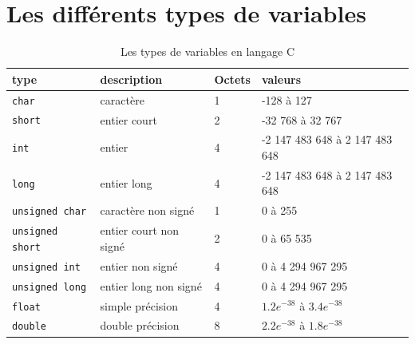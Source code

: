 \documentclass[a4paper,11pt]{book}
\theoremstyle{definition}
\begin{document}
\chapter{Les différents types de variables}
\begin{table}[!h]
\centering
\begin{tabular}{p{2.5cm}p{4cm}p{3cm}p{3cm}}
  \hline
  \textbf{type} & description & Octets & valeurs\\
  \hline
  \texttt{char} & caractère& 1&-128 à 127\\
  \texttt{short}& entier court& 2&-32 768 à 32 767\\
  \texttt{int}& entier& 4&-2 147 483 648 à 2 147 483 648\\
  \texttt{long}& entier long& 4&-2 147 483 648 à 2 147 483 648\\
  \texttt{unsigned char}& caractère non signé&1&0 à 255\\
  \texttt{unsigned short}& entier court non signé&2&0 à 65 535\\
  \texttt{unsigned int}& entier non signé&4&0 à 4 294 967 295\\
  \texttt{unsigned long}& entier long non signé&4&0 à 4 294 967 295\\
  \texttt{float}& simple précision&4&$1.2e^{-38}$ à $3.4e^{-38}$\\
  \texttt{double}& double précision&8&$2.2e^{-38}$ à $1.8e^{-38}$\\

  \hline
\end{tabular}
\caption{Les types de variables en langage C\label{type_extend}}
\end{table}



\newpage\cleardoublepage


\printindex
\end{document}
